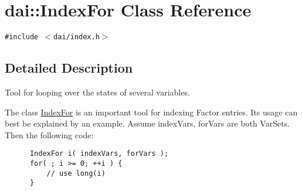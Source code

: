 \hypertarget{classdai_1_1IndexFor}{
\section{dai::IndexFor Class Reference}
\label{classdai_1_1IndexFor}
}
{\tt \#include $<$dai/index.h$>$}



\subsection{Detailed Description}
Tool for looping over the states of several variables. 

The class \hyperlink{classdai_1_1IndexFor}{IndexFor} is an important tool for indexing Factor entries. Its usage can best be explained by an example. Assume indexVars, forVars are both VarSets. Then the following code: 

\begin{Code}\begin{verbatim}      IndexFor i( indexVars, forVars );
      for( ; i >= 0; ++i ) {
          // use long(i)
      }
\end{verbatim}
\end{Code}

